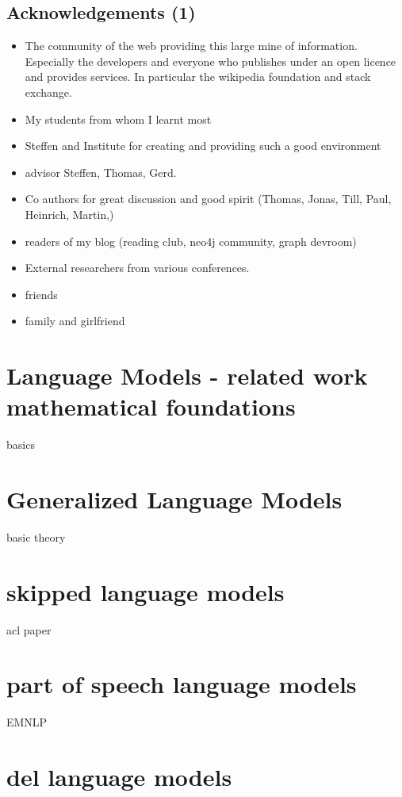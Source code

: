 \documentclass[•]{book}
\begin{document}
\section{Acknowledgements (1)}
\begin{itemize}
\item The community of the web providing this large mine of information. Especially the developers and everyone who publishes under an open licence and provides services. In particular the wikipedia foundation and stack exchange. 
\item My students from whom I learnt most
\item Steffen and Institute for creating and providing such a good environment
\item advisor Steffen, Thomas, Gerd.
\item Co authors for great discussion and good spirit (Thomas, Jonas, Till, Paul, Heinrich, Martin,)
\item readers of my blog (reading club, neo4j community, graph devroom)
\item External researchers from various conferences.\item friends
\item family and girlfriend

\end{itemize}

\chapter{Language Models - related work mathematical foundations}
basics
\chapter{Generalized Language Models}
basic theory
\chapter{skipped language models}
acl paper
\chapter{part of speech language models}
EMNLP
\chapter{del language models}
\end{document}
